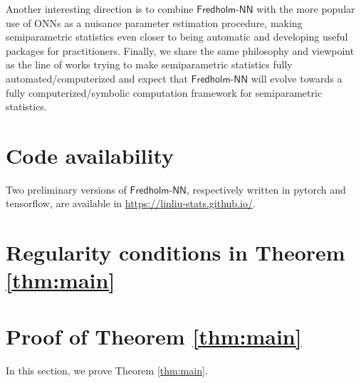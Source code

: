 \documentclass[11pt]{article}
\def\fred{\mathsf{Fredholm\mbox{-}NN}}
\begin{document}
Another interesting direction is to combine $\fred$ with the more popular use of ONNs as a nuisance parameter estimation procedure, making semiparametric statistics even closer to being automatic and developing useful packages for practitioners. Finally, we share the same philosophy and viewpoint as the line of works trying to make semiparametric statistics fully automated/computerized and expect that $\fred$ will evolve towards a fully computerized/symbolic computation framework for semiparametric statistics.

\section{Code availability}
\label{sec:code}

Two preliminary versions of $\fred$, respectively written in pytorch and tensorflow, are available in \href{https://linliu-stats.github.io/}{https://linliu-stats.github.io/}.




\appendix
\section{Regularity conditions in Theorem \ref{thm:main}}
\label{app:regular}

\section{Proof of Theorem \ref{thm:main}}
\label{app:proof}

In this section, we prove Theorem \ref{thm:main}.
\end{document}
